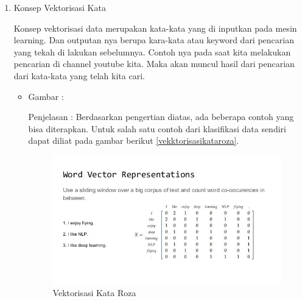 \begin{enumerate}
\item Konsep Vektorisasi Kata 
\par Konsep vektorisasi data merupakan kata-kata yang di inputkan pada mesin learning. Dan outputan nya berupa kara-kata atau keyword dari pencarian yang tekah di lakukan sebelumnya. Contoh nya pada saat kita melakukan pencarian di channel youtube kita. Maka akan muncul hasil dari pencarian dari kata-kata yang telah kita cari.
\par
\begin{itemize}
\item Gambar :
\par Penjelasan : Berdasarkan pengertian diatas, ada beberapa contoh yang bisa diterapkan. Untuk salah satu contoh dari klasifikasi data sendiri dapat diliat pada gambar berikut \ref{vekktorisasikataroza}.
\begin{figure}[!hbtp]
\centering
\includegraphics[scale=0.3]{figures/vekktorisasikataroza.jpg}
\caption{Vektorisasi Kata Roza}
\label{text-fadila}
\end{figure}
\end{itemize}


\end{enumerate}
